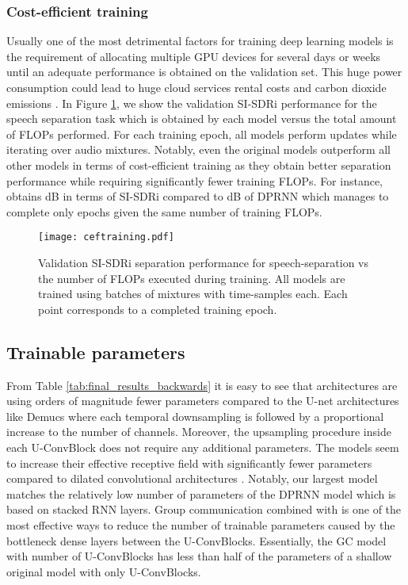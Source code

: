 \subsubsection{Cost-efficient training}
\label{sec:results:efficient_training}
Usually one of the most detrimental factors for training deep learning models is the requirement of allocating multiple GPU devices for several days or weeks until an adequate performance is obtained on the validation set. This huge power consumption could lead to huge cloud services rental costs and carbon dioxide emissions \cite{cai2019onceandforall}. In Figure \ref{fig:costefficienttraining}, we show the validation SI-SDRi performance for the speech separation task which is obtained by each model versus the total amount of FLOPs performed. For each training epoch, all models perform updates while iterating over  audio mixtures. Notably, even the original \sudo models outperform all other models in terms of cost-efficient training as they obtain better separation performance while requiring significantly fewer training FLOPs. For instance, \sudol obtains dB in terms of SI-SDRi compared to dB of DPRNN \cite{luo2019dual} which manages to complete only  epochs given the same number of training FLOPs.   

\begin{figure}[!htb]
    \centering
      \texttt{[image: ceftraining.pdf]}
      \caption{Validation SI-SDRi separation performance for speech-separation vs the number of FLOPs executed during training. All models are trained using batches of  mixtures with  time-samples each. Each point corresponds to a completed training epoch.}
      \label{fig:costefficienttraining}
    \vspace{-15pt}
\end{figure}


\subsection{Trainable parameters}
\label{sec:results:trainable_parameters}
From Table \ref{tab:final_results_backwards} it is easy to see that \sudo architectures are using orders of magnitude fewer parameters compared to the U-net architectures like Demucs \cite{defossez2019demucs} where each temporal downsampling is followed by a proportional increase to the number of channels. Moreover, the upsampling procedure inside each U-ConvBlock does not require any additional parameters. The \sudo models seem to increase their effective receptive field with significantly fewer parameters compared to dilated convolutional architectures \cite{luo2019convTasNet,tzinis2019two}. Notably, our largest model \sudol matches the relatively low number of parameters of the DPRNN \cite{luo2019dual} model which is based on stacked RNN layers. Group communication combined with \sudoi is one of the most effective ways to reduce the number of trainable parameters caused by the bottleneck dense layers between the U-ConvBlocks. Essentially, the \sudoil GC model with  number of U-ConvBlocks has less than half of the parameters of a shallow original \sudos model with only  U-ConvBlocks.

